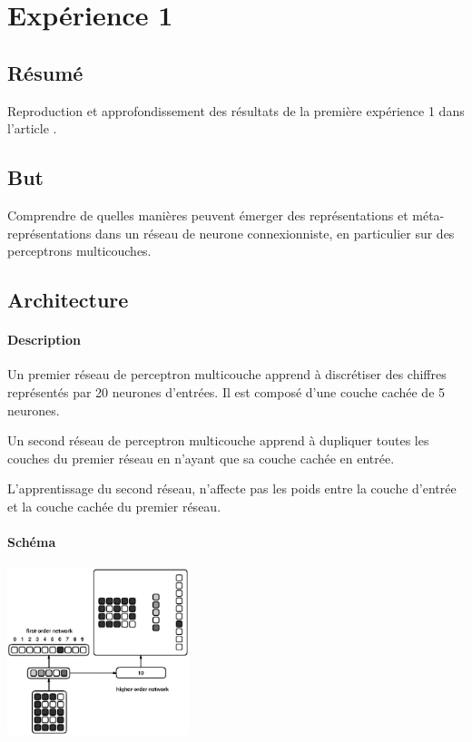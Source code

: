 \documentclass[a4paper,12pt]{article}
\renewcommand{\sectionmark}[1]{\markright{#1}}
\begin{document}
  \section*{Expérience 1} \sectionmark{EXPÉRIENCE 1}
    \subsection*{Résumé}
      Reproduction et approfondissement des résultats de la première expérience 1 dans l'article 
      \cite{Cleeremans_2007}. 

    
    \subsection*{But}
      Comprendre de quelles manières peuvent émerger des représentations et méta-représentations dans 
      un réseau de neurone connexionniste, en particulier sur des perceptrons multicouches.
    
    
    \subsection*{Architecture}
      \paragraph*{Description}
	Un premier réseau de perceptron multicouche apprend à discrétiser des chiffres représentés
	par 20 neurones d'entrées. Il est composé d'une couche cachée de 5 neurones.
	
	Un second réseau de perceptron multicouche apprend à dupliquer toutes les couches du premier
	réseau en n'ayant que sa couche cachée en entrée.
	
	L'apprentissage du second réseau, n'affecte pas les poids entre la couche d'entrée et la 
	couche cachée du premier réseau.

      \paragraph*{Schéma}
	\begin{center}
	  \includegraphics[width=200px]{../cleeremans_2007/digit_reco/digit_reco2.png}
	\end{center}
	
\end{document}
